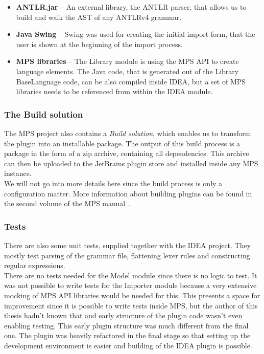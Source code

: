 \begin{itemize}
	\item \textbf{ANTLR.jar} -- An external library, the ANTLR parser, that allows us to build and walk the AST of any ANTLRv4 grammar.
	
	\item \textbf{Java Swing} -- Swing was used for creating the initial import form, that the user is shown at the beginning of the import process.
	
	\item \textbf{MPS libraries} -- The Library module is using the MPS API to create language elements. The Java code, that is generated out of the Library BaseLanguage code, can be also compiled inside IDEA, but a set of MPS libraries needs to be referenced from within the IDEA module.
\end{itemize}

\subsubsection{The Build solution}

The MPS project also contains a \textit{Build solution}, which enables us to transform the plugin into an installable package.
The output of this build process is a package in the form of a zip archive, containing all dependencies.
This archive can then be uploaded to the JetBrains plugin store and installed inside any MPS instance.
\\

We will not go into more details here since the build process is only a configuration matter.
More information about building plugins can be found in the second volume of the MPS manual~\cite{MPS2}.

\subsubsection{Tests}

There are also some unit tests, supplied together with the IDEA project.
They mostly test parsing of the grammar file, flattening lexer rules and constructing regular expressions.
\\

There are no tests needed for the Model module since there is no logic to test.
It was not possible to write tests for the Importer module because a very extensive mocking of MPS API libraries would be needed for this.
This presents a space for improvement since it is possible to write tests inside MPS, but the author of this thesis hadn't known that and early structure of the plugin code wasn't even enabling testing.
This early plugin structure was much different from the final one.
The plugin was heavily refactored in the final stage so that setting up the development environment is easier and building of the IDEA plugin is possible.

